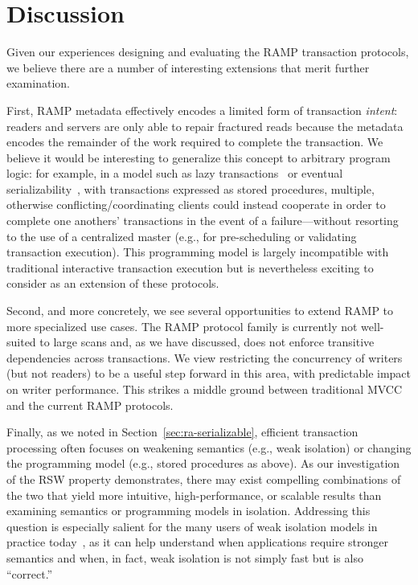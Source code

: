 
\section{Discussion}

Given our experiences designing and evaluating the RAMP transaction
protocols, we believe there are a number of interesting extensions
that merit further examination.

First, RAMP metadata effectively encodes a limited form of transaction
\textit{intent}: readers and servers are only able to repair fractured
reads because the metadata encodes the remainder of the work required
to complete the transaction. We believe it would be interesting to
generalize this concept to arbitrary program logic: for example, in a
model such as lazy transactions~\cite{lazytxn} or eventual
serializability~\cite{eventual-serial}, with transactions expressed as
stored procedures, multiple, otherwise conflicting/coordinating
clients could instead cooperate in order to complete one anothers'
transactions in the event of a failure---without resorting to the use
of a centralized master (e.g., for pre-scheduling or validating transaction
execution). This programming model is largely incompatible with
traditional interactive transaction execution but is nevertheless
exciting to consider as an extension of these protocols.

Second, and more concretely, we see several opportunities to extend
RAMP to more specialized use cases. The RAMP protocol family is
currently not well-suited to large scans and, as we have discussed,
does not enforce transitive dependencies across transactions. We view
restricting the concurrency of writers (but not readers) to be a
useful step forward in this area, with predictable impact on writer
performance. This strikes a middle ground between traditional MVCC and
the current RAMP protocols.

Finally, as we noted in Section~\ref{sec:ra-serializable}, efficient
transaction processing often focuses on weakening semantics (e.g.,
weak isolation) or changing the programming model (e.g., stored
procedures as above). As our investigation of the RSW property
demonstrates, there may exist compelling combinations of the two that
yield more intuitive, high-performance, or scalable results than
examining semantics or programming models in isolation. Addressing
this question is especially salient for the many users of weak
isolation models in practice today~\cite{hat-vldb}, as it can help
understand when applications require stronger semantics and when, in
fact, weak isolation is not simply fast but is also ``correct.''

